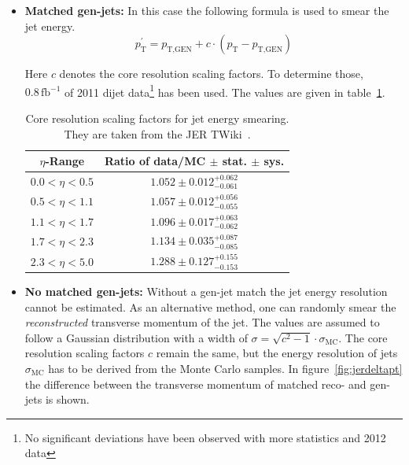 \begin{itemize}
\item \textbf{Matched gen-jets:} In this case the following formula is used to smear the jet energy.
  \begin{equation}
    \label{eq:jermatched}
    p^\prime_{\text{T}} = p_{\text{T}, \text{GEN}} + c \cdot (p_{\text{T}} - p_{\text{T}, \text{GEN}})
  \end{equation}
  
  \noindent Here $c$ denotes the core resolution scaling factors. To determine those, $0.8\,\text{fb}^{-1}$ of 2011 dijet data\footnote{No significant deviations have been observed with more statistics and 2012 data} has been used. The values are given in table~\ref{tab:jerfactors}.

  \begin{table}[htbp!]
    \centering
    {\renewcommand{\arraystretch}{1.2}
      \begin{tabular}{|c|c|}
        \hline
        $\eta$-Range & Ratio of data/MC $\pm$ stat. $\pm$ sys. \\ \hline \hline
        $0.0 < \eta < 0.5$ & $1.052 \pm 0.012 ^{+0.062}_{-0.061}$ \\ \hline
        $0.5 < \eta < 1.1$ & $1.057 \pm 0.012 ^{+0.056}_{-0.055}$ \\ \hline
        $1.1 < \eta < 1.7$ & $1.096 \pm 0.017 ^{+0.063}_{-0.062}$ \\ \hline
        $1.7 < \eta < 2.3$ & $1.134 \pm 0.035 ^{+0.087}_{-0.085}$ \\ \hline
        $2.3 < \eta < 5.0$ & $1.288 \pm 0.127 ^{+0.155}_{-0.153}$ \\ \hline
      \end{tabular}
    }
    \caption{Core resolution scaling factors for jet energy smearing. They are taken from the JER TWiki~\cite{jer}.}
    \label{tab:jerfactors}
  \end{table}
  
\item \textbf{No matched gen-jets:} Without a gen-jet match the jet energy resolution cannot be estimated. As an alternative method, one can randomly smear the \textit{reconstructed} transverse momentum of the jet. The values are assumed to follow a Gaussian distribution with a width of $\sigma = \sqrt{c^2-1} \cdot \sigma_{\text{MC}}$. The core resolution scaling factors $c$ remain the same, but the energy resolution of jets $\sigma_{\text{MC}}$ has to be derived from the Monte Carlo samples. In figure~\ref{fig:jerdeltapt} the difference between the transverse momentum of matched reco- and gen-jets is shown.


\end{itemize}

